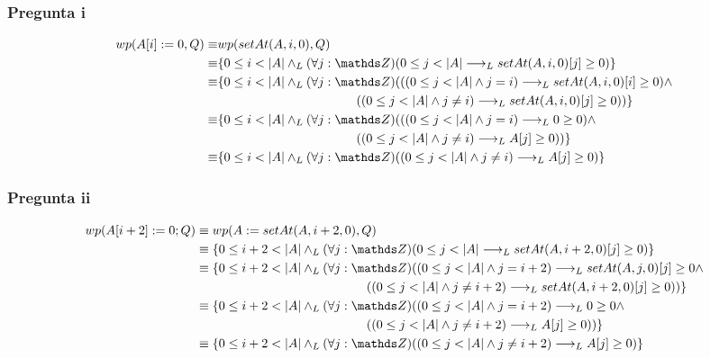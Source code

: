 \subsubsection*{Pregunta i}
\begin{align*}
    wp( A[i] := 0, Q ) \equiv &wp(setAt(A,i,0), Q) \\
    \equiv &\{ 0 \leq i < |A| \yLuego (\forall j: \ent)(0 \leq j < |A| \implicaLuego setAt(A,i,0)[j] \geq 0 ) \} \\
    \equiv &\{ 0 \leq i < |A| \yLuego (\forall j: \ent)(((0 \leq j < |A| \wedge j = i) \implicaLuego setAt(A,i,0)[i] \geq 0) \wedge \\
    &\qquad \qquad \qquad \qquad \qquad \quad ((0 \leq j < |A| \wedge j \neq i) \implicaLuego setAt(A,i,0)[j] \geq 0 )) \} \\
    \equiv &\{ 0 \leq i < |A| \yLuego (\forall j: \ent)(((0 \leq j < |A| \wedge j = i) \implicaLuego 0 \geq 0) \wedge \\
    &\qquad \qquad \qquad \qquad \qquad \quad ((0 \leq j < |A| \wedge j \neq i) \implicaLuego A[j] \geq 0 )) \} \\
    \equiv &\{ 0 \leq i < |A| \yLuego (\forall j: \ent)((0 \leq j < |A| \wedge j \neq i) \implicaLuego A[j] \geq 0) \} \\
\end{align*}

\subsubsection*{Pregunta ii}
\begin{align*}
    wp(A[i+2] := 0;Q) &\equiv wp(A := setAt(A, i+2, 0), Q) \\    
    &\equiv \{ 0 \leq i+2 < |A| \yLuego (\forall j: \ent)(0 \leq j < |A| \implicaLuego setAt(A, i+2, 0)[j] \geq 0) \} \\
    &\equiv \{ 0 \leq i+2 < |A| \yLuego (\forall j: \ent)((0 \leq j < |A| \wedge j = i+2) \implicaLuego setAt(A, j, 0)[j] \geq 0 \wedge \\
    &\qquad \qquad \qquad \qquad \qquad \qquad \quad \; \; ((0 \leq j < |A| \wedge j \neq i+2) \implicaLuego setAt(A, i+2, 0)[j] \geq 0)) \} \\
    &\equiv \{ 0 \leq i+2 < |A| \yLuego (\forall j: \ent)((0 \leq j < |A| \wedge j = i+2) \implicaLuego 0 \geq 0 \wedge \\
    &\qquad \qquad \qquad \qquad \qquad \qquad \quad \; \; ((0 \leq j < |A| \wedge j \neq i+2) \implicaLuego A[j] \geq 0)) \} \\
    &\equiv \{ 0 \leq i+2 < |A| \yLuego (\forall j: \ent)((0 \leq j < |A| \wedge j \neq i+2) \implicaLuego A[j] \geq 0) \} \\
\end{align*}

